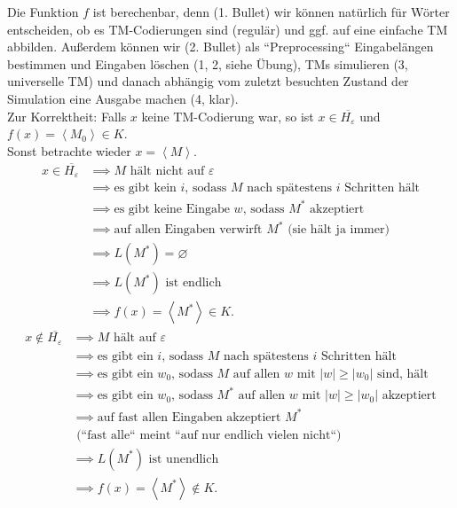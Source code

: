 \documentclass[11pt,a4paper]{article}
\let\emptyset\varnothing
\begin{document}
Die Funktion \( f \) ist berechenbar, denn (1. Bullet) wir können nat\"urlich f\"ur W\"orter entscheiden, ob es TM-Codierungen sind (regul\"ar) und {ggf.} auf eine einfache TM abbilden. Au\ss erdem können wir (2. Bullet) als ``Preprocessing`` Eingabel\"angen bestimmen und Eingaben l\"oschen (1, 2, siehe \"Ubung), TMs simulieren (3, universelle TM) und danach abh\"angig vom zuletzt besuchten Zustand der Simulation eine Ausgabe machen (4, klar).\\
Zur Korrektheit: Falls \( x \) keine TM-Codierung war, so ist \( x \in \overline{H_\varepsilon} \) und \( f(x) = \left\langle M_0 \right\rangle \in K \).\\ Sonst betrachte wieder \( x = \left\langle M \right\rangle \).
\begin{align*}
	x \in \overline{H_\varepsilon} &\implies M \text{ h\"alt nicht auf } \varepsilon\\
		&\implies \text{es gibt kein } i \text{, sodass } M \text{ nach sp\"atestens } i \text{ Schritten h\"alt}\\
		&\implies \text{es gibt keine Eingabe } w \text{, sodass } M^\ast \text{ akzeptiert}\\
		&\implies \text{auf allen Eingaben verwirft } M^\ast \text{ (sie h\"alt ja immer)} \\
		&\implies L(M^\ast) = \emptyset\\
		&\implies L(M^\ast) \text{ ist endlich}\\
		&\implies f(x) = \left\langle M^\ast \right\rangle \in K.
\end{align*}
\begin{align*}
	x \notin \overline{H_\varepsilon} &\implies M \text{ h\"alt auf } \varepsilon\\
		&\implies \text{es gibt ein } i \text{, sodass } M \text{ nach sp\"atestens } i \text{ Schritten h\"alt}\\
		&\implies \text{es gibt ein } w_0 \text{, sodass } M \text{ auf allen } w \text{ mit } \left| w \right| \geq \left| w_0 \right| \text{ sind, h\"alt}\\
		&\implies \text{es gibt ein } w_0 \text{, sodass } M^\ast \text{ auf allen } w \text{ mit } \left| w \right| \geq \left| w_0 \right| \text{ akzeptiert}\\
		&\implies \text{auf fast allen Eingaben akzeptiert } M^\ast\\
		&\text{ (``fast alle`` meint ``auf nur endlich vielen nicht``)} \\
		&\implies L(M^\ast) \text{ ist unendlich}\\
		&\implies f(x) = \left\langle M^\ast \right\rangle \notin K.
\end{align*}
\end{document}
